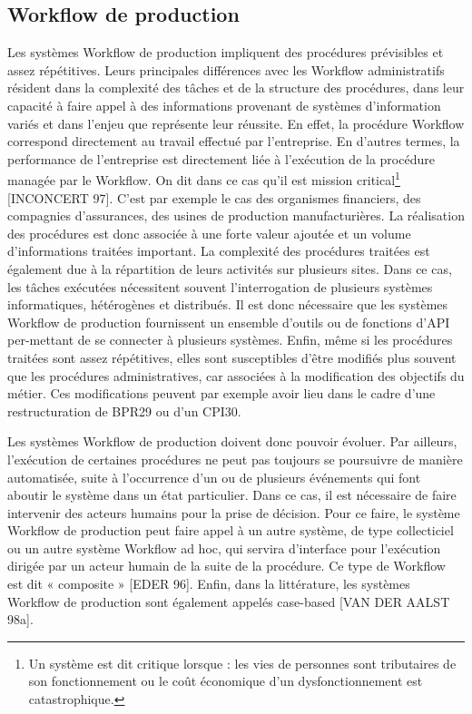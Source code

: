 \subsection{Workflow de production} 
Les systèmes Workflow de production impliquent des procédures prévisibles et assez répétitives. Leurs principales différences avec les Workflow administratifs résident dans la
complexité des tâches et de la structure des procédures, dans leur capacité à faire appel à des
informations provenant de systèmes d’information variés et dans l’enjeu que représente leur
réussite. En effet, la procédure Workflow correspond directement au travail effectué par
l’entreprise. En d’autres termes, la performance de l’entreprise est directement liée à
l’exécution de la procédure managée par le Workflow. On dit dans ce cas qu’il est mission
critical\footnote{\samepage  Un système est dit critique lorsque : les vies de personnes sont tributaires de son fonctionnement ou le coût économique d'un dysfonctionnement est catastrophique. } [INCONCERT 97]. C’est par exemple le cas des organismes financiers, des compagnies d’assurances, des usines de production manufacturières. La réalisation des procédures
est donc associée à une forte valeur ajoutée et un volume d’informations traitées important.
La complexité des procédures traitées est également due à la répartition de leurs activités
sur plusieurs sites. Dans ce cas, les tâches exécutées nécessitent souvent l’interrogation de
plusieurs systèmes informatiques, hétérogènes et distribués. Il est donc nécessaire que les systèmes Workflow de production fournissent un ensemble d’outils ou de fonctions d’API per-mettant de se connecter à plusieurs systèmes. Enfin, même si les procédures traitées sont assez répétitives, elles sont susceptibles d’être modifiés plus souvent que les procédures administratives, car associées à la modification des objectifs du métier. Ces modifications peuvent
par exemple avoir lieu dans le cadre d’une restructuration de BPR29 ou d’un CPI30. 

Les systèmes Workflow de production doivent donc pouvoir évoluer. Par ailleurs,
l’exécution de certaines procédures ne peut pas toujours se poursuivre de manière automatisée, suite à l’occurrence d’un ou de plusieurs événements qui font aboutir le système dans un
état particulier. Dans ce cas, il est nécessaire de faire intervenir des acteurs humains pour la
prise de décision. Pour ce faire, le système Workflow de production peut faire appel à un autre système, de type collecticiel ou un autre système Workflow ad hoc, qui servira d’interface
pour l’exécution dirigée par un acteur humain de la suite de la procédure. Ce type de Workflow est dit « composite » [EDER 96]. Enfin, dans la littérature, les systèmes Workflow de
production sont également appelés case-based [VAN DER AALST 98a]. 

